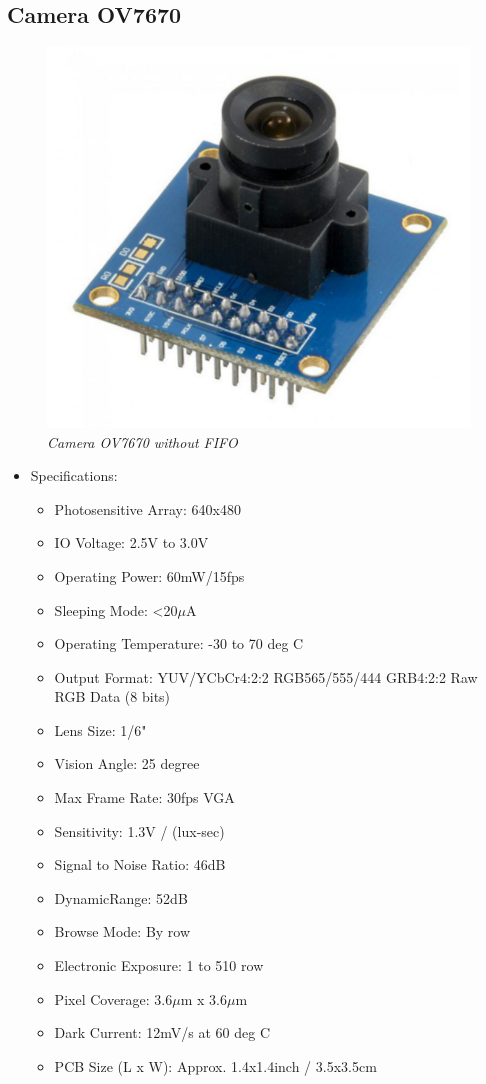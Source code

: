 \documentclass[D:/Latex/Internship/Report/Latex/Report.tex]{subfiles}
\begin{document}
		\subsection{Camera OV7670}
			\begin{figure}[!ht]
				\centering
				\includegraphics[width = 0.6\linewidth]{Figure/OV7670.pdf}
				\caption{\it Camera OV7670 without FIFO}
			\end{figure}
			\begin{itemize}
				\item Specifications:
				\begin{itemize}
					\item Photosensitive Array: 640x480
					\item IO Voltage: 2.5V to 3.0V
					\item Operating Power: 60mW/15fps
					\item Sleeping Mode: <20$\mu$A
					\item Operating Temperature: -30 to 70 deg C
					\item Output Format: YUV/YCbCr4:2:2 RGB565/555/444 GRB4:2:2 Raw RGB Data (8 bits)
					\item Lens Size: 1/6"
					\item Vision Angle: 25 degree
					\item Max Frame Rate: 30fps VGA
					\item Sensitivity: 1.3V / (lux-sec)
					\item Signal to Noise Ratio: 46dB
					\item DynamicRange: 52dB
					\item Browse Mode: By row
					\item Electronic Exposure: 1 to 510 row
					\item Pixel Coverage: 3.6$\mu$m x 3.6$\mu$m
					\item Dark Current: 12mV/s at 60 deg C
					\item PCB Size (L x W): Approx. 1.4x1.4inch / 3.5x3.5cm
				\end{itemize}
			\end{itemize}
\end{document}
